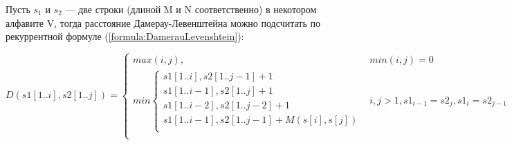     Пусть $s_{1}$ и $s_{2}$ — две строки (длиной M и N соответственно) в некотором алфавите V,
    тогда расстояние Дамерау-Левенштейна можно подсчитать по рекуррентной формуле (\ref{formula:DamerauLevenshtein}):

    \begin{equation}\label{formula:DamerauLevenshtein}
        D(s1[1..i],s2[1..j]) = \left\{ \begin{array}{ll}
            max(i, j), & \textrm{$min(i, j) = 0$}\\

            min \left\{ \begin{array}{lll}
                s1[1..i], s2[1..j-1] + 1                 \\
                s1[1..i-1], s2[1..j] + 1                 \\
                s1[1..i-2], s2[1..j-2] + 1               \\ 
                s1[1..i-1],s2[1..j-1] + M(s[i], s[j])    \\
                \end{array} \right. & \textrm{$i, j > 1, s1_{i-1} = s2_j, s1_i = s2_{j-1}$}\\


        \end{array} \right.
    \end{equation}

\newpage
